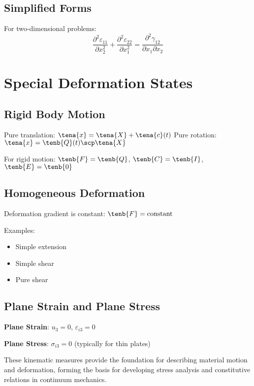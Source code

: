 \subsection{Simplified Forms}

For two-dimensional problems:
\begin{equation}
\frac{\partial^2 \varepsilon_{11}}{\partial x_2^2} + \frac{\partial^2 \varepsilon_{22}}{\partial x_1^2} = \frac{\partial^2 \gamma_{12}}{\partial x_1 \partial x_2}
\end{equation}

\section{Special Deformation States}

\subsection{Rigid Body Motion}

Pure translation: $\tena{x} = \tena{X} + \tena{c}(t)$
Pure rotation: $\tena{x} = \tenb{Q}(t) \scp \tena{X}$

For rigid motion: $\tenb{F} = \tenb{Q}$, $\tenb{C} = \tenb{I}$, $\tenb{E} = \tenb{0}$

\subsection{Homogeneous Deformation}

Deformation gradient is constant: $\tenb{F} = \text{constant}$

Examples:
\begin{itemize}
\item Simple extension
\item Simple shear
\item Pure shear
\end{itemize}

\subsection{Plane Strain and Plane Stress}

\textbf{Plane Strain}: $u_3 = 0$, $\varepsilon_{i3} = 0$

\textbf{Plane Stress}: $\sigma_{i3} = 0$ (typically for thin plates)

These kinematic measures provide the foundation for describing material motion and deformation, forming the basis for developing stress analysis and constitutive relations in continuum mechanics.

